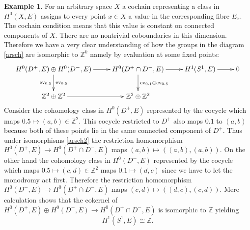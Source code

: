 \documentclass[10pt]{amsart}
\theoremstyle{definition}
\newtheorem{ex}[defn]{Example}
\theoremstyle{plain}
\theoremstyle{remark}
\newcommand{\Z}{\mathbb{Z}}
\newcommand{\intersection}{\cap}
\newcommand{\ev}{\mathrm{ev}}
\begin{document}
\begin{ex}
\newline
For an arbitrary space $X$ a cochain representing a class in $H^0(X,E)$ assigns to every point $x\in X$ a value in the corresponding fibre $E_x$. The cochain condition means that this value is constant on connected components of $X$. There are no nontrivial coboundaries in this dimension. Therefore we have a very clear understanding of how the groups in the diagram \ref{arsch} are isomorphic to $\Z^k$ namely by evaluation at some fixed points:
\begin{align}\label{arsch2}
  \xymatrix{
  H^0(D^+,E)\oplus H^0(D^-,E)\ar[r]\ar[d]_{\ev_{0.5}}^{\ev_{0.5}} & H^0(D^+\intersection D^-,E)\ar[r]\ar[d]^{\ev_{0.1}\oplus\ev_{0.5}} & H^1(S^1,E)\ar[r] & 0\\
  \Z^2\oplus\Z^2\ar[r] & \Z^2\oplus\Z^2 & & 
  }
\end{align}
Consider the cohomology class in $H^0(D^+,E)$ represented by the cocycle which maps $0.5\mapsto (a,b)\in\Z^2$. This cocycle restricted to $D^+$ also maps $0.1$ to $(a,b)$ because both of these points lie in the same connected component of $D^+$. Thus under isomorphisms \ref{arsch2} the restriction homomorphism $H^0(D^+,E)\to H^0(D^+\intersection D^-,E)$ maps $(a,b)\mapsto ((a,b),(a,b))$.
On the other hand the cohomology class in $H^0(D^-,E)$ represented by the cocycle which maps $0.5\mapsto (c,d)\in\Z^2$ maps $0.1\mapsto (d,c)$ since we have to let the monodromy act first. Therefore the restriction homomorphism $H^0(D^-,E)\to H^0(D^+\intersection D^-,E)$ maps $(c,d)\mapsto ((d,c),(c,d))$.
Mere calculation shows that the cokernel of $H^0(D^+,E)\oplus H^0(D^-,E)\to H^0(D^+\intersection D^-,E)$ is isomorphic to $\Z$ yielding $$H^1(S^1,E)\cong\Z\text{.}$$
\end{ex}
\end{document}
